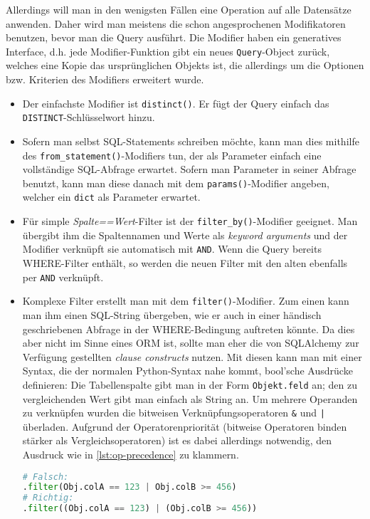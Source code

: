 Allerdings will man in den wenigsten Fällen eine Operation auf alle Datensätze
anwenden. Daher wird man meistens die schon angesprochenen Modifikatoren
benutzen, bevor man die Query ausführt. Die Modifier haben ein generatives
Interface, d.h. jede Modifier-Funktion gibt ein neues \texttt{Query}-Object
zurück, welches eine Kopie das ursprünglichen Objekts ist, die allerdings um die
Optionen bzw. Kriterien des Modifiers erweitert wurde.

\begin{itemize}
\item Der einfachste Modifier ist \texttt{distinct()}. Er fügt der Query einfach
das \texttt{DISTINCT}-Schlüsselwort hinzu.


\item Sofern man selbst SQL-Statements schreiben möchte, kann man dies mithilfe
des \texttt{from\_statement()}-Modifiers tun, der als Parameter einfach eine
vollständige SQL-Abfrage erwartet. Sofern man Parameter in seiner Abfrage
benutzt, kann man diese danach mit dem \texttt{params()}-Modifier angeben,
welcher ein \texttt{dict} als Parameter erwartet.


\item Für simple \emph{Spalte==Wert}-Filter ist der
\texttt{filter\_by()}-Modifier geeignet. Man übergibt ihm die Spaltennamen und
Werte als \textit{keyword arguments} und der Modifier verknüpft sie automatisch
mit \texttt{AND}. Wenn die Query bereits WHERE-Filter enthält, so werden die
neuen Filter mit den alten ebenfalls per \texttt{AND} verknüpft.


\item Komplexe Filter erstellt man mit dem \texttt{filter()}-Modifier. Zum einen
kann man ihm einen SQL-String übergeben, wie er auch in einer händisch
geschriebenen Abfrage in der WHERE-Bedingung auftreten könnte. Da dies aber
nicht im Sinne eines ORM ist, sollte man eher die von SQLAlchemy zur Verfügung
gestellten \emph{clause constructs} nutzen. Mit diesen kann man mit einer
Syntax, die der normalen Python-Syntax nahe kommt, bool'sche Ausdrücke
definieren: Die Tabellenspalte gibt man in der Form \texttt{Objekt.feld} an; den
zu vergleichenden Wert gibt man einfach als String an. Um mehrere Operanden zu
verknüpfen wurden die bitweisen Verknüpfungsoperatoren \texttt{\&} und
\texttt{|} überladen. Aufgrund der Operatorenpriorität (bitweise Operatoren binden
stärker als Vergleichsoperatoren) ist es dabei allerdings notwendig, den
Ausdruck wie in \autoref{lst:op-precedence} zu klammern.
\begin{lstlisting}[language=Python,label=lst:op-precedence,caption=Korrekte
Klammerung]
# Falsch:
.filter(Obj.colA == 123 | Obj.colB >= 456)
# Richtig:
.filter((Obj.colA == 123) | (Obj.colB >= 456))
\end{lstlisting}


\end{itemize}
